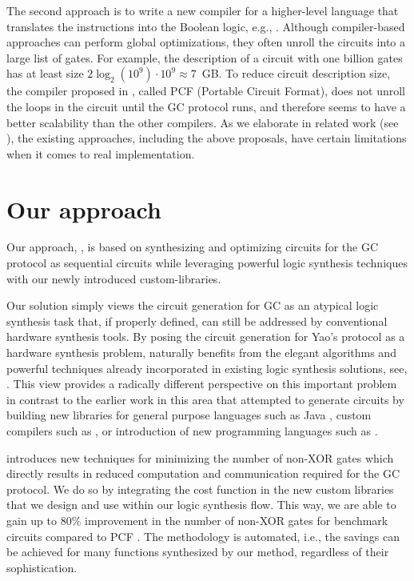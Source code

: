 The second approach is to write a new compiler for a higher-level language that translates the instructions into the Boolean logic, e.g., \cite{malkhi2004fairplay,kreuter2012billion,kreuter2013pcf,franz2014cbmc}.
Although compiler-based approaches can perform global optimizations, they often unroll the circuits into a large list of gates.
For example, the description of a circuit with one billion gates has at least size $2 \log_2 (10^9) \cdot 10^{9} \approx 7$~GB.
To reduce circuit description size, the compiler proposed in \cite{kreuter2013pcf}, called PCF (Portable Circuit Format), does not unroll the loops in the circuit until the GC protocol runs, and therefore seems to have a better scalability than the other compilers.
As we elaborate in related work (see ), the existing approaches, including the above proposals, have certain limitations when it comes to real implementation.

\section{Our approach}
Our approach, \sys{}, is based on synthesizing and optimizing circuits for the GC protocol as sequential circuits while leveraging powerful logic synthesis techniques with our newly introduced custom-libraries.

Our solution simply views the circuit generation for GC as an atypical logic synthesis task that, if properly defined, can still be addressed by conventional hardware synthesis tools.
By posing the circuit generation for Yao's protocol as a hardware synthesis problem, \sys{} naturally benefits from the elegant algorithms and powerful techniques already incorporated in existing logic synthesis solutions, see, \cite{sentovich1992sis,micheli1994synthesis,devadas1994logic,brayton1987mis}.
This view provides a radically different perspective on this important problem in contrast to the earlier work in this area that attempted to generate circuits by building new libraries for general purpose languages such as Java \cite{huang2011faster,malka2011vmcrypt}, custom compilers such as \cite{kreuter2013pcf,franz2014cbmc}, or introduction of new programming languages such as \cite{malkhi2004fairplay,rastogi2014wysteria}.

\sys{} introduces new techniques for minimizing the number of non-XOR gates which directly results in reduced computation and communication required for the GC protocol.
We do so by integrating the cost function in the new custom libraries that we design and use within our logic synthesis flow.
This way, we are able to gain up to $80\%$ improvement in the number of non-XOR gates for benchmark circuits compared to PCF \cite{kreuter2013pcf}.
The \sys{} methodology is automated, i.e., the savings can be achieved for many functions synthesized by our method, regardless of their sophistication.

